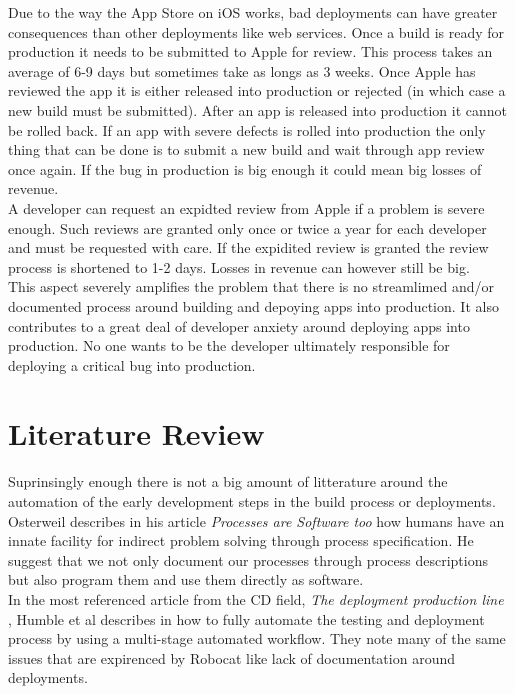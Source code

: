 \documentclass{ituthesis}
\begin{document}
Due to the way the App Store on iOS works, bad deployments can have greater consequences than other deployments like web services. Once a build is ready for production it needs to be submitted to Apple for review. This process takes an average of 6-9 days but sometimes take as longs as 3 weeks. Once Apple has reviewed the app it is either released into production or rejected (in which case a new build must be submitted). After an app is released into production it cannot be rolled back. If an app with severe defects is rolled into production the only thing that can be done is to submit a new build and wait through app review once again. If the bug in production is big enough it could mean big losses of revenue.\\

A developer can request an expidted review from Apple if a problem is severe enough. Such reviews are granted only once or twice a year for each developer and must be requested with care. If the expidited review is granted the review process is shortened to 1-2 days. Losses in revenue can however still be big.\\

This aspect severely amplifies the problem that there is no streamlimed and/or documented process around building and depoying apps into production. It also contributes to a great deal of developer anxiety around deploying apps into production. No one wants to be the developer ultimately responsible for deploying a critical bug into production.

\chapter{Literature Review}

Suprinsingly enough there is not a big amount of litterature around the automation of the early development steps in the build process or deployments.\\

Osterweil \cite{Osterweil1997} describes in his article \textit{Processes are Software too} how humans have an innate facility for indirect problem solving through process specification. He suggest that we not only document our processes through process descriptions but also program them and use them directly as software.\\

In the most referenced article from the CD field, \textit{The deployment production line} \cite{Humble2006}, Humble et al describes in how to fully automate the testing and deployment process by using a multi-stage automated workflow. They note many of the same issues that are expirenced by Robocat like lack of documentation around deployments.\\
\end{document}
